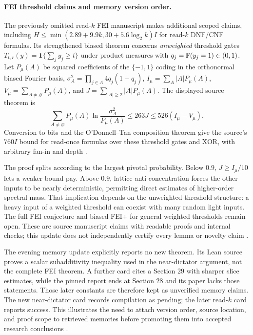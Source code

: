 \paragraph{FEI threshold claims and memory version order.}
The previously omitted read-$k$ FEI manuscript makes additional scoped claims, including
$H\leq\min(2.89+9.9k,30+5.6\log_2k)I$ for read-$k$ DNF/CNF formulas.
Its strengthened biased theorem concerns \emph{unweighted} threshold gates
$T_{t,r}(y)=\mathbf1\{\sum_jy_j\geq t\}$ under product measures with $q_j=\mathbb{P}(y_j=1)\in(0,1)$.
Let $P_\mu(A)$ be squared coefficients of the $\{-1,1\}$ coding in the orthonormal biased Fourier basis, $\sigma_A^2=\prod_{j\in A}4q_j(1-q_j)$, $I_\mu=\sum_A|A|P_\mu(A)$, $V_\mu=\sum_{A\ne\varnothing}P_\mu(A)$, and $J=\sum_{|A|\geq2}|A|P_\mu(A)$.
The displayed source theorem is
\[
 \sum_{A\ne\varnothing}P_\mu(A)\ln\frac{\sigma_A^2}{P_\mu(A)}
 \leq263J\leq526(I_\mu-V_\mu).
\]
Conversion to bits and the O'Donnell--Tan composition theorem give the source's $760I$ bound for read-once formulas over these threshold gates and XOR, with arbitrary fan-in and depth \citep{CaseFEIReadKManuscript2026,ODonnellTanFEI}.

The proof splits according to the largest pivotal probability.
Below $0.9$, $J\geq I_\mu/10$ lets a weaker bound pay.
Above $0.9$, lattice anti-concentration forces the other inputs to be nearly deterministic, permitting direct estimates of higher-order spectral mass.
That implication depends on the unweighted threshold structure: a heavy input of a weighted threshold can coexist with many random light inputs.
The full FEI conjecture and biased FEI+ for general weighted thresholds remain open.
These are source manuscript claims with readable proofs and internal checks; this update does not independently certify every lemma or novelty claim \citep{CaseFEIReadKManuscript2026,CaseFEIReadKReport2026}.

The evening memory update explicitly reports no new theorem.
Its Lean source proves a scalar subadditivity inequality used in the near-dictator argument, not the complete FEI theorem.
A further card cites a Section 29 with sharper slice estimates, while the pinned report ends at Section 28 and its paper lacks those statements.
Those later constants are therefore kept as unverified memory claims.
The new near-dictator card records compilation as pending; the later read-$k$ card reports success.
This illustrates the need to attach version order, source location, and proof scope to retrieved memories before promoting them into accepted research conclusions \citep{CaseFEISubadd2026,CaseFEINearDictatorCard2026,CaseFEIReadKCardUpdate2026}.
